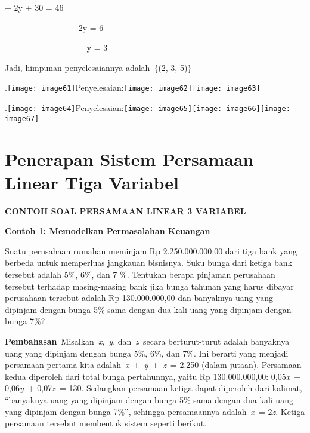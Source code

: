\documentclass[11pt,fleqn]{book} %
\begin{document}
 + 2y + 30 = 46

\noindent ~~~~~~~~~~~~~~~~~ 2y = 6

\noindent ~~~~~~~~~~~~~~~~~~~ y = 3

\noindent Jadi, himpunan penyelesaiannya adalah~$\{$(2, 3, 5)$\}$

\noindent 

.\texttt{[image: image61]}Penyelesaian:\texttt{[image: image62]}\texttt{[image: image63]}

.\texttt{[image: image64]}Penyelesaian:\texttt{[image: image65]}\texttt{[image: image66]}\texttt{[image: image67]}

\noindent 

\noindent 

\noindent


\section{Penerapan Sistem Persamaan Linear Tiga Variabel}


\noindent \textbf{CONTOH SOAL PERSAMAAN LINEAR 3 VARIABEL}

\noindent \textbf{}

\noindent \textbf{Contoh 1: Memodelkan Permasalahan Keuangan}

\noindent Suatu perusahaan rumahan meminjam Rp 2.250.000.000,00 dari tiga bank yang berbeda untuk memperluas jangkauan bisnisnya. Suku bunga dari ketiga bank tersebut adalah 5\%, 6\%, dan 7 \%. Tentukan berapa pinjaman perusahaan tersebut terhadap masing-masing bank jika bunga tahunan yang harus dibayar perusahaan tersebut adalah Rp 130.000.000,00 dan banyaknya uang yang dipinjam dengan bunga 5\% sama dengan dua kali uang yang dipinjam dengan bunga 7\%?

\noindent \textbf{}

\noindent \textbf{Pembahasan}~Misalkan~\textit{x},~\textit{y}, dan~\textit{z}~secara berturut-turut adalah banyaknya uang yang dipinjam dengan bunga 5\%, 6\%, dan 7\%. Ini berarti yang menjadi persamaan pertama kita adalah~\textit{x}~+~\textit{y}~+~\textit{z}~= 2.250 (dalam jutaan). Persamaan kedua diperoleh dari total bunga pertahunnya, yaitu Rp 130.000.000,00: 0,05\textit{x}~+ 0,06\textit{y}~+ 0,07\textit{z}~= 130. Sedangkan persamaan ketiga dapat diperoleh dari kalimat, ``banyaknya uang yang dipinjam dengan bunga 5\% sama dengan dua kali uang yang dipinjam dengan bunga 7\%'', sehingga persamaannya adalah~\textit{x}~= 2\textit{z}. Ketiga persamaan tersebut membentuk sistem seperti berikut.
\end{document}
